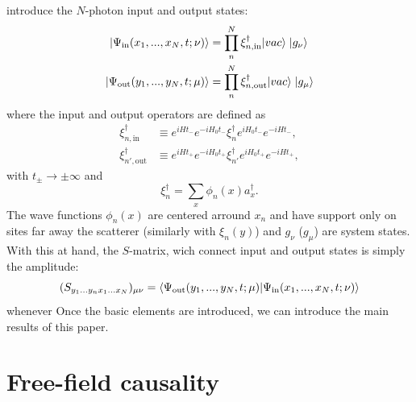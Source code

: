 \documentclass[notitlepage, prx, preprint, amsmath,superscriptaddress,amssymb]{revtex4-1}
\begin{document}
 introduce the $N$-photon  input and output states:
\begin{align}
| \Psi_{\rm in} (x_1, ..., x_N, t; \nu) \rangle &= \prod_n^N  \xi^\dagger_{n, \text{in}} |vac \rangle  \; |g_\nu \rangle
\\
| \Psi_{\rm out} (y_1, ..., y_N, t; \mu) \rangle &= \prod_{n}^N \xi^\dagger_{n, \text{out}} |vac \rangle  \; |g_\mu \rangle
\end{align} 
where the input and output operators are defined as
\begin{align}
\xi_{n,\text{in}}^\dagger & \equiv e^{iHt_-} e^{-iH_0t_-}\xi_n^\dagger e^{iH_0 t_-} e^{-iHt_-},\\
\xi_{n',\text{out}}^\dagger & \equiv e^{iHt_+} e^{-iH_0t_+}\xi_{n'}^\dagger e^{iH_0 t_+} e^{-iHt_+},
\end{align}
with $t_\pm \to\pm\infty$ and
\begin{equation}
\xi_n^\dagger = \sum_x  \phi_n(x) a_x^\dagger.
\end{equation}
The wave functions $\phi_n(x)$ are centered arround $x_n$ and  have support only on sites far away the scatterer (similarly with $\xi_n (y)$) and  $g_\nu$  ($g_\mu$) are system states.  With this at hand, the $S$-matrix, wich connect input and output states is simply the amplitude:
\begin{equation}
( S_{y_1 ...y_n x_1...x_N} )_{\mu \nu} =  \langle \Psi_{\rm out} (y_1, ..., y_N, t; \mu) | \Psi_{\rm in} (x_1, ..., x_N, t; \nu) \rangle
\end{equation}
whenever 
Once the basic elements are introduced, we can introduce the main results of this paper.  


\section{Free-field causality}
\end{document}
